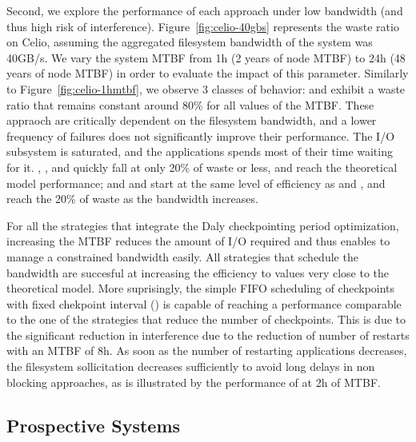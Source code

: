 Second, we explore the performance of each approach under low
bandwidth (and thus high risk of
interference). Figure~\ref{fig:celio-40gbs} represents the waste ratio
on Celio, assuming the aggregated filesystem bandwidth of the system
was 40GB/s. We vary the system MTBF from 1h (2 years of node MTBF) to
24h (48 years of node MTBF) in order to evaluate the impact of this
parameter. Similarly to Figure~\ref{fig:celio-1hmtbf}, we observe 3
classes of behavior: \propfixed and \bfifofixed exhibit a waste ratio
that remains constant around 80\% for all values of the MTBF. These
appraoch are critically dependent on the filesystem bandwidth, and a
lower frequency of failures does not significantly improve their
performance. The I/O subsystem is saturated, and the applications
spends most of their time waiting for it. \fifodaly, \fifofixed, and
\cooperative quickly fall at only 20\% of waste or less, and reach
the theoretical model performance; and \propdaly and \bfifodaly start
at the same level of efficiency as \propfixed and \bfifofixed, and
reach the 20\% of waste as the bandwidth increases.

For all the strategies that integrate the Daly checkpointing period
optimization, increasing the MTBF reduces the amount of I/O required
and thus enables to manage a constrained bandwidth easily. All
strategies that schedule the bandwidth are succesful at increasing the
efficiency to values very close to the theoretical model. More
suprisingly, the simple FIFO scheduling of checkpoints with fixed
chekpoint interval (\bfifofixed) is capable of reaching a performance
comparable to the one of the strategies that reduce the number of
checkpoints. This is due to the significant reduction in interference
due to the reduction of number of restarts with an MTBF of 8h. As soon
as the number of restarting applications decreases, the filesystem
sollicitation decreases sufficiently to avoid long delays in non blocking
approaches, as is illustrated by the performance of \fifofixed at 2h
of MTBF.

\subsection{Prospective Systems}

